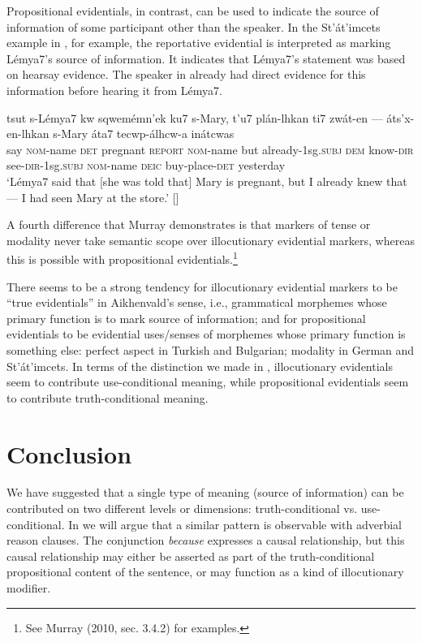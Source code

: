 Propositional evidentials, in contrast, can be used to indicate the source of information of some participant other than the speaker. In the St’át’imcets example in , for example, the reportative evidential is interpreted as marking Lémya7’s source of information. It indicates that Lémya7’s statement was based on hearsay evidence. The speaker in  already had direct evidence for this information before hearing it from Lémya7.


\ea
\gll tsut  s-Lémya7  kw  sqwemémn’ek  ku7  s-Mary,  t’u7  plán-lhkan ti7  zwát-en  —  áts’x-en-lhkan  s-Mary  áta7  tecwp-álhcw-a  inátcwas\\
say  \textsc{nom}-name  \textsc{det}  pregnant  \textsc{report  nom}-name  but  already-1sg.\textsc{subj} \textsc{dem}  know-\textsc{dir}    see-\textsc{dir}-1sg.\textsc{subj}  \textsc{nom}-name  \textsc{deic}  buy-place-\textsc{det}  yesterday\\
\glt ‘Lémya7 said that [she was told that] Mary is pregnant, but I already knew that — I had seen Mary at the store.’   [\citealt{Matthewson2007}]
\z

A fourth difference that Murray demonstrates is that markers of tense or modality never take semantic scope over illocutionary evidential markers, whereas this is possible with propositional evidentials.\footnote{See Murray (2010, sec. 3.4.2) for examples.}



There seems to be a strong tendency for illocutionary evidential markers to be “true evidentials” in Aikhenvald’s sense, i.e., grammatical morphemes whose primary function is to mark source of information; and for propositional evidentials to be evidential uses/senses of morphemes whose primary function is something else: perfect aspect in Turkish and Bulgarian; modality in German and St’át’imcets. In terms of the distinction we made in , illocutionary evidentials seem to contribute use-conditional meaning, while propositional evidentials seem to contribute truth-conditional meaning.


\section{Conclusion}\label{sec:} %

We have suggested that a single type of meaning (source of information) can be contributed on two different levels or dimensions: truth-conditional vs. use-conditional. In  we will argue that a similar pattern is observable with adverbial reason clauses. The conjunction \textit{because} expresses a causal relationship, but this causal relationship may either be asserted as part of the truth-conditional propositional content of the sentence, or may function as a kind of illocutionary modifier.



